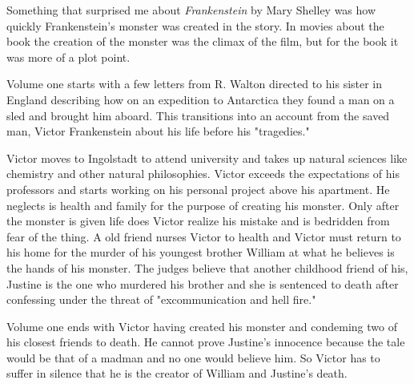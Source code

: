 Something that surprised me about {\it Frankenstein} by Mary Shelley
was how quickly Frankenstein's monster was created in the story.
In movies about the book the creation of the monster was
the climax of the film, but for the book it was more of a plot
point.

Volume one starts with a few letters from R. Walton
directed to his sister in England describing how on
an expedition to Antarctica they found a man on a sled
and brought him aboard. This transitions into an account
from the saved man, Victor Frankenstein about his life
before his "tragedies."

Victor moves to Ingolstadt to attend university and takes up
natural sciences like chemistry and other natural philosophies.
Victor exceeds the expectations of his professors and starts
working on his personal project above his apartment. He neglects
is health and family for the purpose of creating his monster.
Only after the monster is given life does Victor realize his mistake
and is bedridden from fear of the thing. A old friend nurses Victor
to health and Victor must return to his home for the murder of his
youngest brother William at what he believes is the hands of his monster.
The judges believe that another childhood friend of his, Justine is the
one who murdered his brother and she is sentenced to death after
confessing under the threat of "excommunication and hell fire."

Volume one ends with Victor having created his monster and condeming
two of his closest friends to death. He cannot prove Justine's
innocence because the tale would be that of a madman and no one would
believe him. So Victor has to suffer in silence that he is the creator
of William and Justine's death.